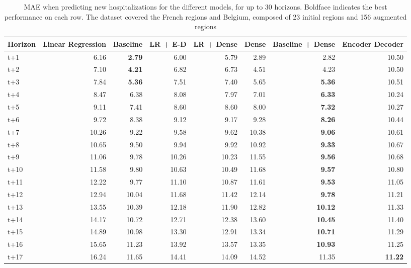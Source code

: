 \begin{table}[H]
\centering
\caption{MAE when predicting new hospitalizations for the different models, for up to 30 horizons. Boldface indicates the best performance on each row. The dataset covered the French regions and Belgium, composed of 23 initial regions and 156 augmented regions }
\label{tab:MAE_comparison}
\begin{tabular}{lrrrrrrr}
\toprule
Horizon &  Linear Regression &  Baseline &  LR + E-D &  LR + Dense &  Dense &  Baseline + Dense &  Encoder Decoder \\
\midrule
t+1  & 6.16  & \textbf{2.79}  & 6.00  & 5.79  & 2.89  & 2.82  & 10.50  \\
t+2  & 7.10  & \textbf{4.21}  & 6.82  & 6.73  & 4.51  & 4.23  & 10.50  \\
t+3  & 7.84  & \textbf{5.36}  & 7.51  & 7.40  & 5.65  & \textbf{5.36}  & 10.51  \\
t+4  & 8.47  & 6.38  & 8.08  & 7.97  & 7.01  & \textbf{6.33}  & 10.24  \\
t+5  & 9.11  & 7.41  & 8.60  & 8.60  & 8.00  & \textbf{7.32}  & 10.27  \\
t+6  & 9.72  & 8.38  & 9.12  & 9.17  & 9.28  & \textbf{8.26}  & 10.44  \\
t+7  & 10.26  & 9.22  & 9.58  & 9.62  & 10.38  & \textbf{9.06}  & 10.61  \\
t+8  & 10.65  & 9.50  & 9.94  & 9.92  & 10.92  & \textbf{9.33}  & 10.67  \\
t+9  & 11.06  & 9.78  & 10.26  & 10.23  & 11.55  & \textbf{9.56}  & 10.68  \\
t+10  & 11.58  & 9.80  & 10.63  & 10.49  & 11.68  & \textbf{9.57}  & 10.80  \\
t+11  & 12.22  & 9.77  & 11.10  & 10.87  & 11.61  & \textbf{9.53}  & 11.05  \\
t+12  & 12.94  & 10.04  & 11.68  & 11.42  & 12.14  & \textbf{9.78}  & 11.21  \\
t+13  & 13.55  & 10.39  & 12.18  & 11.90  & 12.82  & \textbf{10.12}  & 11.33  \\
t+14  & 14.17  & 10.72  & 12.71  & 12.38  & 13.60  & \textbf{10.45}  & 11.40  \\
t+15  & 14.89  & 10.98  & 13.30  & 12.91  & 13.34  & \textbf{10.71}  & 11.29  \\
t+16  & 15.65  & 11.23  & 13.92  & 13.57  & 13.35  & \textbf{10.93}  & 11.25  \\
t+17  & 16.24  & 11.65  & 14.41  & 14.09  & 14.52  & 11.35  & \textbf{11.22}  \\

\end{tabular}
\end{table}
